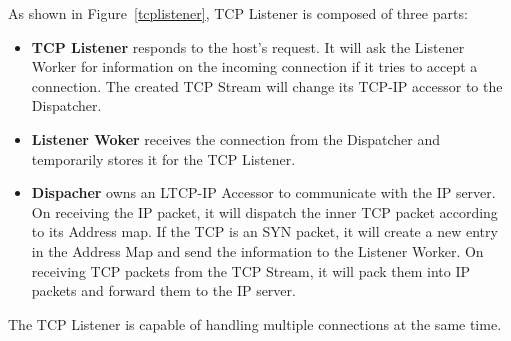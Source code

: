 As shown in Figure~\ref{tcplistener}, TCP Listener is composed of three parts:
\begin{itemize}
  \item \textbf{TCP Listener} responds to the host's request. It will ask the Listener Worker for information on the incoming connection if it tries to accept a connection. The created TCP Stream will change its TCP-IP accessor to the Dispatcher.
  \item \textbf{Listener Woker} receives the connection from the Dispatcher and temporarily stores it for the TCP Listener.
  \item \textbf{Dispacher} owns an LTCP-IP Accessor to communicate with the IP server. On receiving the IP packet, it will dispatch the inner TCP packet according to its Address map. If the TCP is an SYN packet, it will create a new entry in the Address Map and send the information to the Listener Worker. On receiving TCP packets from the TCP Stream, it will pack them into IP packets and forward them to the IP server.
\end{itemize}
The TCP Listener is capable of handling multiple connections at the same time.
